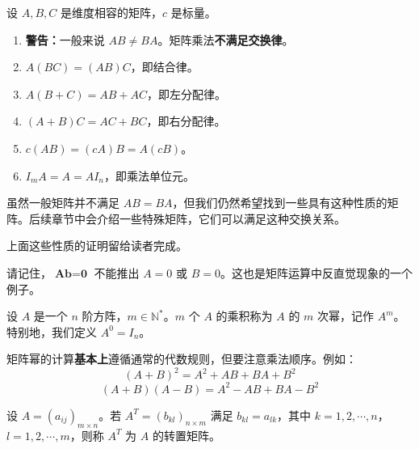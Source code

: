 \begin{property}[矩阵乘法的性质]
设 $A,B,C$ 是维度相容的矩阵，$c$ 是标量。
\begin{enumerate}
    \item \textbf{警告：}一般来说 $AB\neq BA$。矩阵乘法\textbf{不满足交换律}。
    \item $A(BC)=(AB)C$，即结合律。
    \item $A(B+C)=AB+AC$，即左分配律。
    \item $(A+B)C=AC+BC$，即右分配律。
    \item $c(AB)=(cA)B=A(cB)$。
    \item $I_mA=A=AI_n$，即乘法单位元。
\end{enumerate}
\end{property}

虽然一般矩阵并不满足 $AB=BA$，但我们仍然希望找到一些具有这种性质的矩阵。后续章节中会介绍一些特殊矩阵，它们可以满足这种交换关系。

上面这些性质的证明留给读者完成。

\begin{remark}
请记住，$\textbf{A}\textbf{b}=\textbf{0}$ 不能推出 $A=0$ 或 $B=0$。这也是矩阵运算中反直觉现象的一个例子。
\end{remark}

\begin{definition}
设 $A$ 是一个 $n$ 阶方阵，$m\in\mathbb{N}^{*}$。$m$ 个 $A$ 的乘积称为 $A$ 的 $m$ 次幂，记作 $A^m$。特别地，我们定义 $A^0=I_n$。
\end{definition}

矩阵幂的计算\textbf{基本上}遵循通常的代数规则，但要注意乘法顺序。例如：
\[(A+B)^2 = A^2 + AB + BA + B^2\]
\[(A+B)(A-B) = A^2 - AB + BA - B^2\]

\begin{definition}
设 $A=(a_{ij})_{m\times n}$。若 $A^T=(b_{kl})_{n\times m}$ 满足 $b_{kl}=a_{lk}$，其中 $k=1,2,\cdots,n$，$l=1,2,\cdots,m$，则称 $A^T$ 为 $A$ 的转置矩阵。
\end{definition}

